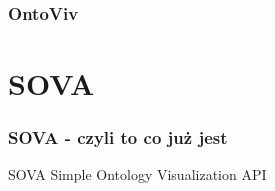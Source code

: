 \documentclass{beamer}
\begin{document}
\begin{frame}
  \frametitle{OntoViv}
\begin{center}
\end{center}
\end{frame}


\section{SOVA}
\begin{frame}
	\frametitle{SOVA - czyli to co już jest}
	 \begin{block}{SOVA}
		Simple Ontology Visualization API
	\end{block} 
\end{frame}
\end{document}
